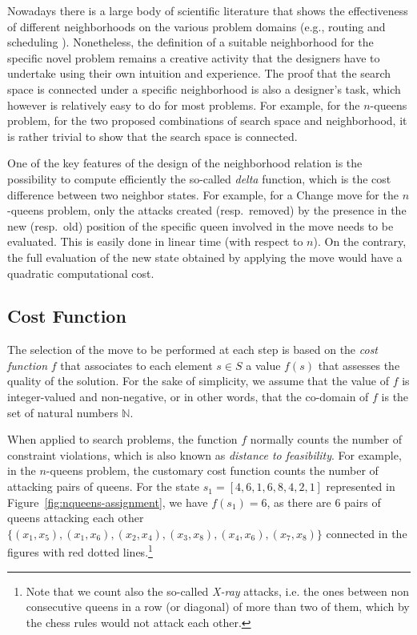 Nowadays there is a large body of scientific literature that shows the
effectiveness of different neighborhoods on the various problem
domains (e.g., routing and scheduling \cite{IIKM05}).
Nonetheless, the definition of a suitable neighborhood for the
specific novel problem remains a creative activity that the designers
have to undertake using their own intuition and experience. The proof
that the search space is connected under a specific neighborhood is
also a designer's task, which however is relatively easy to do for
most problems. For example, for the $n$-queens problem, for the two
proposed combinations of search space and neighborhood, it is rather
trivial to show that the search space is connected.

One of the key features of the design of the neighborhood relation is
the possibility to compute efficiently the so-called \emph{delta}
function, which is the cost difference between two neighbor states.
For example, for a \textsf{Change} move for the $n$-queens problem,
only the attacks created (resp.\ removed) by the presence in the new
(resp.\ old) position of the specific queen involved in the move needs
to be evaluated. This is easily done in linear time (with respect to
$n$). On the contrary, the full evaluation of the new state obtained
by applying the move would have a quadratic computational cost.

\subsection{Cost Function}

The selection of the move to be performed at each step is based on the
\emph{cost function} $f$ that associates to each element $s\in S$ a
value $f(s)$ that assesses the quality of the solution. For the sake
of simplicity, we assume that the value of $f$ is integer-valued and
non-negative, or in other words, that the co-domain of $f$ is the set
of natural numbers $\mathbb{N}$.

When applied to search problems, the function $f$ normally counts the
number of constraint violations, which is also known as 
\emph{distance to feasibility}. For example, in the $n$-queens
problem, the customary cost function counts the number of attacking
pairs of queens. For the state $s_1 = [4,6,1,6,8,4,2,1]$ 
represented in Figure~\ref{fig:nqueens-assignment},
we have $f(s_1) = 6$, as there are 6 pairs of queens attacking each
other $\{(x_1,x_5), (x_1,x_6), (x_2,x_4), (x_3,x_8),  (x_4,x_6),  (x_7,x_8)\}$ 
connected in the figures with red dotted lines.\footnote{Note that we count also the so-called \emph{X-ray} attacks, i.e. the ones between non consecutive queens in a row (or diagonal) of more than two of them, which by the chess rules would not attack each other.}

